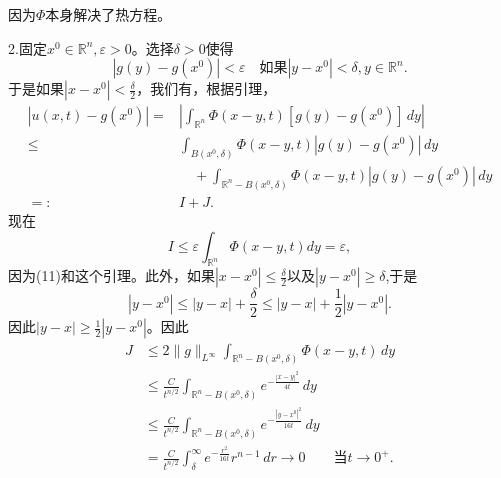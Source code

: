 \documentclass[leqno]{article}
\numberwithin{equation}{subsection}%
\begin{document}
因为$\Phi$本身解决了热方程。
\par
2.固定$x^{0}\in\mathbb{R}^{n},\varepsilon>0$。选择$\delta>0$使得
\begin{equation}
|g(y)-g(x^{0})|<\varepsilon\quad\text{如果}|y-x^{0}|<\delta,y\in\mathbb{R}^{n}.
\end{equation}
于是如果$|x-x^{0}|<\frac{\delta}{2}$，我们有，根据引理，
\begin{equation*}
\begin{aligned}
|u(x,t)-g(x^{0})|=&|\int_{\mathbb{R}^{n}}\Phi(x-y,t)[g(y)-g(x^{0})]\,dy|\\
\leq&\int_{B(x^{0},\delta)}\Phi(x-y,t)|g(y)-g(x^{0})|\,dy\\
&{\quad}{}+\int_{\mathbb{R}^{n}-B(x^{0},\delta)}\Phi(x-y,t)|g(y)-g(x^{0})|\,dy\\
=:&I+J.
\end{aligned}
\end{equation*}
现在
\begin{equation*}
I\leq\varepsilon\int_{\mathbb{R}^{n}}\Phi(x-y,t)dy=\varepsilon,
\end{equation*}
因为(11)和这个引理。此外，如果$|x-x^{0}|\leq\frac{\delta}{2}$以及$|y-x^{0}|\geq\delta$,于是
\begin{equation*}
|y-x^{0}|\leq|y-x|+\frac{\delta}{2}\leq|y-x|+\frac{1}{2}|y-x^{0}|.
\end{equation*}
因此$|y-x|\geq\frac{1}{2}|y-x^{0}|$。因此
\begin{equation*}
\begin{aligned}
J&\leq 2\|g\|_{L^{\infty}}\int_{\mathbb{R}^{n}-B(x^{0},\delta)}\Phi(x-y,t)\,dy\\
&\leq\frac{C}{t^{n/2}}\int_{\mathbb{R}^{n}-B(x^{0},\delta)}e^{-\frac{|x-y|^{2}}{4t}}\,dy\\
&\leq\frac{C}{t^{n/2}}\int_{\mathbb{R}^{n}-B(x^{0},\delta)}e^{-\frac{|y-x^{0}|^{2}}{16t}}\,dy\\
&=\frac{C}{t^{n/2}}\int_{\delta}^{\infty}e^{-\frac{r^{2}}{16t}}r^{n-1}\,dr\rightarrow 0\qquad\text{当}t\rightarrow 0^{+}.
\end{aligned}
\end{equation*}
\end{document}
